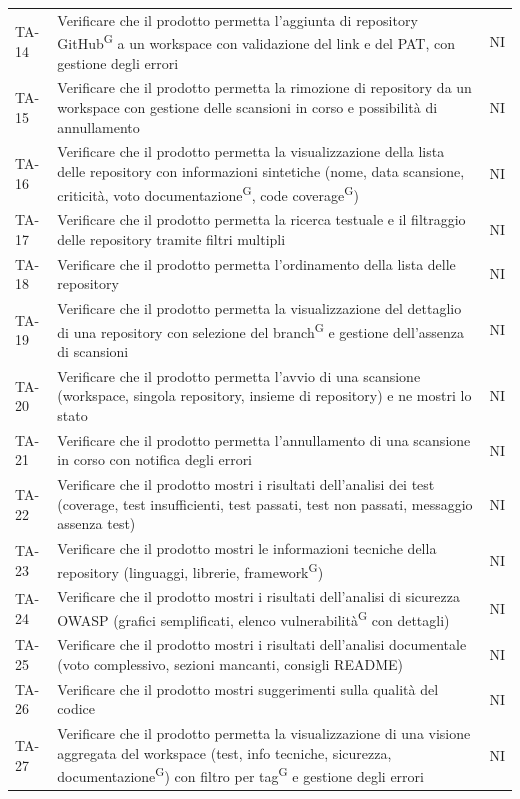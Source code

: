 \documentclass[a4paper, 11pt]{article}
\begin{document}
\begin{longtable}{>{\centering\arraybackslash}m{1.5cm} >{\raggedright\arraybackslash}p{11cm} >{\centering\arraybackslash}m{1.2cm}}
TA-14 & Verificare che il prodotto permetta l'aggiunta di repository GitHub\textsuperscript{G} a un workspace con validazione del link e del PAT, con gestione degli errori & NI \\
TA-15 & Verificare che il prodotto permetta la rimozione di repository da un workspace con gestione delle scansioni in corso e possibilità di annullamento & NI \\
TA-16 & Verificare che il prodotto permetta la visualizzazione della lista delle repository con informazioni sintetiche (nome, data scansione, criticità, voto documentazione\textsuperscript{G}, code coverage\textsuperscript{G}) & NI \\
TA-17 & Verificare che il prodotto permetta la ricerca testuale e il filtraggio delle repository tramite filtri multipli & NI \\
TA-18 & Verificare che il prodotto permetta l'ordinamento della lista delle repository & NI \\
TA-19 & Verificare che il prodotto permetta la visualizzazione del dettaglio di una repository con selezione del branch\textsuperscript{G} e gestione dell'assenza di scansioni & NI \\
TA-20 & Verificare che il prodotto permetta l'avvio di una scansione (workspace, singola repository, insieme di repository) e ne mostri lo stato & NI \\
TA-21 & Verificare che il prodotto permetta l'annullamento di una scansione in corso con notifica degli errori & NI \\
TA-22 & Verificare che il prodotto mostri i risultati dell'analisi dei test (coverage, test insufficienti, test passati, test non passati, messaggio assenza test) & NI \\
TA-23 & Verificare che il prodotto mostri le informazioni tecniche della repository (linguaggi, librerie, framework\textsuperscript{G}) & NI \\
TA-24 & Verificare che il prodotto mostri i risultati dell'analisi di sicurezza OWASP (grafici semplificati, elenco vulnerabilità\textsuperscript{G} con dettagli) & NI \\
TA-25 & Verificare che il prodotto mostri i risultati dell'analisi documentale (voto complessivo, sezioni mancanti, consigli README) & NI \\
TA-26 & Verificare che il prodotto mostri suggerimenti sulla qualità del codice & NI \\
TA-27 & Verificare che il prodotto permetta la visualizzazione di una visione aggregata del workspace (test, info tecniche, sicurezza, documentazione\textsuperscript{G}) con filtro per tag\textsuperscript{G} e gestione degli errori & NI \\

\end{longtable}
\end{document}
